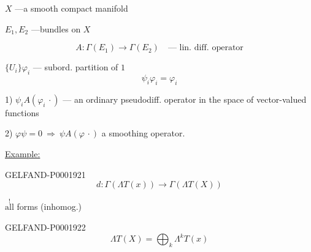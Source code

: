 $X$ —a smooth compact manifold

$E_1, E_2$ —bundles on $X$



\begin{equation*}
A\colon\Gamma (E_1)\longrightarrow\Gamma (E_2)\quad\text{— lin. diff. operator}
\end{equation*}






$\{U_i\}$\qquad $\varphi_i$ — subord. partition of $1$
\begin{equation*}\psi_i\varphi_i=\varphi_i\end{equation*}



1) $\psi_i A (\varphi_i\,\cdot)$ — an ordinary pseudodiff. operator in the space of
vector-valued functions



2) $\varphi\psi=0\ \Rightarrow\ \psi A (\varphi\,\cdot)$ a smoothing operator.





\par\noindent\begin{minipage}{\linewidth}
\underline{Example:}



\begin{GelfandAdjacentEvidence}{GELFAND-P000192}{1}
\begin{equation*}
d\colon\Gamma (\Lambda T (x))\longrightarrow\Gamma (\Lambda T (X))
\end{equation*}
\end{GelfandAdjacentEvidence}
\end{minipage}\par


$\overset{!}{\text{all}}$ forms (inhomog.)



\begin{GelfandAdjacentEvidence}{GELFAND-P000192}{2}
\begin{equation*}
\Lambda T (X)=\bigoplus_k\Lambda^kT (x)
\end{equation*}
\end{GelfandAdjacentEvidence}

